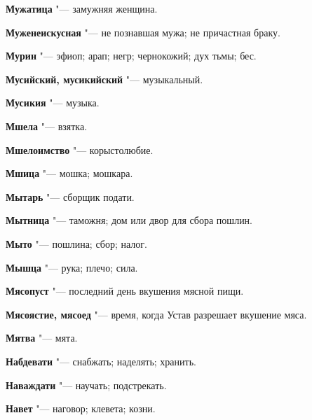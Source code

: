 \begin{mymulticols}{2}
\noindent\textbf{Мужатица} "--- замужняя женщина. 




\noindent\textbf{Муженеискусная} "--- не познавшая мужа; не причастная браку. 




\noindent\textbf{Мурин} "--- эфиоп; арап; негр; чернокожий; дух тьмы; бес. 




\noindent\textbf{Мусийский, мусикийский} "--- музыкальный. 




\noindent\textbf{Мусикия} "--- музыка. 




\noindent\textbf{Мшела} "--- взятка. 




\noindent\textbf{Мшелоимство} "--- корыстолюбие. 




\noindent\textbf{Мшица} "--- мошка; мошкара. 




\noindent\textbf{Мытарь} "--- сборщик подати. 




\noindent\textbf{Мытница} "--- таможня; дом или двор для сбора пошлин. 




\noindent\textbf{Мыто} "--- пошлина; сбор; налог. 




\noindent\textbf{Мышца} "--- рука; плечо; сила. 




\noindent\textbf{Мясопуст} "--- последний день вкушения мясной пищи. 




\noindent\textbf{Мясоястие, мясоед} "--- время, когда Устав разрешает вкушение мяса. 




\noindent\textbf{Мятва} "--- мята. 




\bukvaending






\noindent\textbf{Набдевати} "--- снабжать; наделять; хранить. 




\noindent\textbf{Наваждати} "--- научать; подстрекать. 




\noindent\textbf{Навет} "--- наговор; клевета; козни. 





\end{mymulticols}
